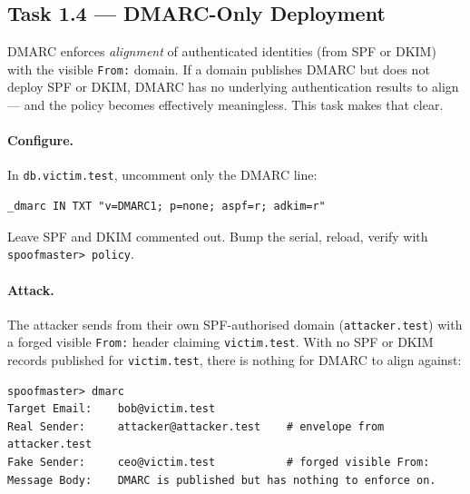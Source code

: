 \documentclass[11pt]{article}
\begin{document}
\subsection{Task 1.4 --- DMARC-Only Deployment}

DMARC enforces \emph{alignment} of authenticated identities (from SPF
or DKIM) with the visible \texttt{From:} domain. If a domain publishes
DMARC but does not deploy SPF or DKIM, DMARC has no underlying
authentication results to align --- and the policy becomes
effectively meaningless. This task makes that clear.

\paragraph{Configure.}
In \texttt{db.victim.test}, uncomment only the DMARC line:

\begin{listing}[H]
\begin{verbatim}
_dmarc IN TXT "v=DMARC1; p=none; aspf=r; adkim=r"
\end{verbatim}
\end{listing}

Leave SPF and DKIM commented out. Bump the serial, reload, verify
with \texttt{spoofmaster> policy}.

\paragraph{Attack.}
The attacker sends from their own SPF-authorised domain
(\texttt{attacker.test}) with a forged visible \texttt{From:} header
claiming \texttt{victim.test}. With no SPF or DKIM records published
for \texttt{victim.test}, there is nothing for DMARC to align against:

\begin{listing}[H]
\begin{verbatim}
spoofmaster> dmarc
Target Email:    bob@victim.test
Real Sender:     attacker@attacker.test    # envelope from attacker.test
Fake Sender:     ceo@victim.test           # forged visible From:
Message Body:    DMARC is published but has nothing to enforce on.
\end{verbatim}
\end{listing}
\end{document}
